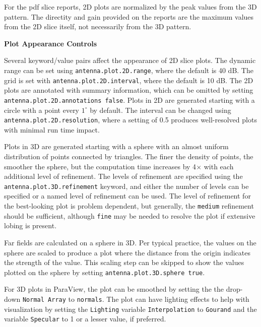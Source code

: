 \documentclass[titlepage]{article}
\renewcommand\_{\textunderscore\linebreak[1]}
\begin{document}
For the pdf slice reports, 2D plots are normalized by the peak values from the 3D pattern.  The directity and gain provided on the reports are the maximum values from the 2D slice itself, not necessarily from the 3D pattern.\newline

\noindent \textbf{Plot Appearance Controls}\newline

Several keyword/value pairs affect the appearance of 2D slice plots.  The dynamic range can be set using \texttt{antenna.plot.2D.range}, where the default is 40 dB.  The grid is set with \texttt{antenna.plot.2D.interval}, where the default is 10 dB.  The 2D plots are annotated with summary information, which can be omitted by setting \texttt{antenna.plot.2D.annotations false}. Plots in 2D are generated starting with a circle with a point every $1^\circ$ by default.  The interval can be changed using \texttt{antenna.plot.2D.resolution}, where a setting of 0.5 produces well-resolved plots with minimal run time impact.

Plots in 3D are generated starting with a sphere with an almost uniform distribution of points connected by triangles.  The finer the density of points, the smoother the sphere, but the computation time increases by 4$\times$ with each additional level of refinement.  The levels of refinement are specified using the \texttt{antenna.plot.3D.refinement} keyword, and either the number of levels can be specified or a named level of refinement can be used.  The level of refinement for the best-looking plot is problem dependent, but generally, the \texttt{medium} refinement should be sufficient, although \texttt{fine} may be needed to resolve the plot if extensive lobing is present.

Far fields are calculated on a sphere in 3D.  Per typical practice, the values on the sphere are scaled to produce a plot where the distance from the origin indicates the strength of the value.  This scaling step can be skipped to show the values plotted on the sphere by setting \texttt{antenna.plot.3D.sphere true}.

For 3D plots in ParaView, the plot can be smoothed by setting the the drop-down \texttt{Normal Array} to \texttt{normals}.  The plot can have lighting effects to help with visualization by setting the \texttt{Lighting} variable \texttt{Interpolation} to \texttt{Gourand} and the variable \texttt{Specular} to 1 or a lesser value, if preferred.\newline
\end{document}

